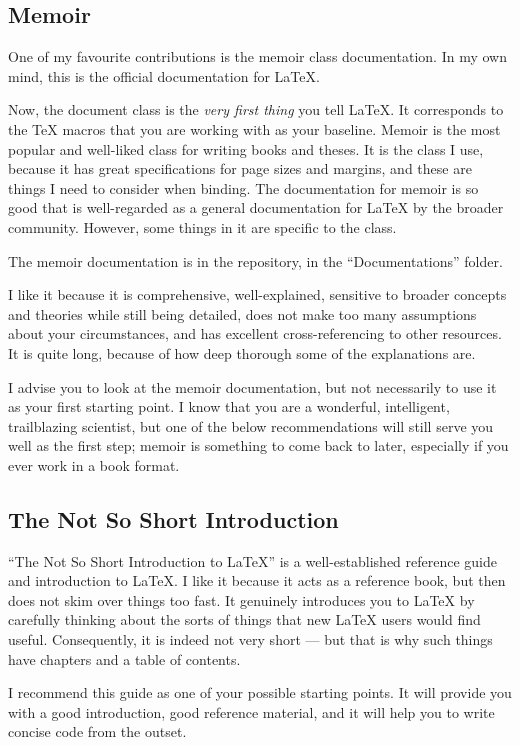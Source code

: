\documentclass[11pt, oneside]{memoir}
\begin{document}
\subsection{Memoir}

One of my favourite contributions is the memoir class documentation. In my own mind, this is the official documentation for LaTeX.

Now, the document class is the \emph{very first thing} you tell LaTeX. It corresponds to the TeX macros that you are working with as your baseline. Memoir is the most popular and well-liked class for writing books and theses. It is the class I use, because it has great specifications for page sizes and margins, and these are things I need to consider when binding. The documentation for memoir is so good that is well-regarded as a general documentation for LaTeX by the broader community. However, some things in it are specific to the class.

The memoir documentation is in the repository, in the  ``Documentations'' folder. 

I like it because it is comprehensive, well-explained, sensitive to broader concepts and theories while still being detailed, does not make too many assumptions about your circumstances, and has excellent cross-referencing to other resources. It is quite long, because of how deep thorough some of the explanations are.

I advise you to look at the memoir documentation, but not necessarily to use it as your first starting point. I know that you are a wonderful, intelligent, trailblazing scientist, but one of the below recommendations will still serve you well as the first step; memoir is something to come back to later, especially if you ever work in a book format.

\subsection{The Not So Short Introduction}

``The Not So Short Introduction to LaTeX'' is a well-established reference guide and introduction to LaTeX. I like it because it acts as a reference book, but then does not skim over things too fast. It genuinely introduces you to LaTeX by carefully thinking about the sorts of things that new LaTeX users would find useful. Consequently, it is indeed not very short — but that is why such things have chapters and a table of contents.

I recommend this guide as one of your possible starting points. It will provide you with a good introduction, good reference material, and it will help you to write concise code from the outset.
\end{document}

